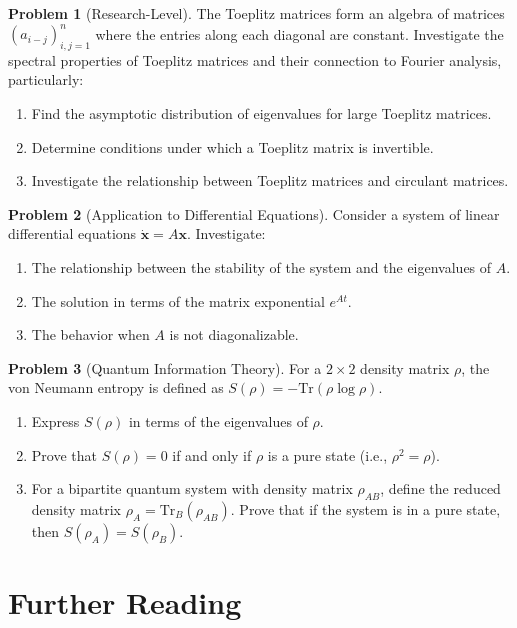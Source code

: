 \documentclass[12pt,a4paper]{article}
\theoremstyle{definition}
\newtheorem{problem}{Problem}[section]
\begin{document}
\begin{problem}[Research-Level]
The Toeplitz matrices form an algebra of matrices $(a_{i-j})_{i,j=1}^n$ where the entries along each diagonal are constant. Investigate the spectral properties of Toeplitz matrices and their connection to Fourier analysis, particularly:
\begin{enumerate}[label=(\alph*)]
\item Find the asymptotic distribution of eigenvalues for large Toeplitz matrices.
\item Determine conditions under which a Toeplitz matrix is invertible.
\item Investigate the relationship between Toeplitz matrices and circulant matrices.
\end{enumerate}
\end{problem}

\begin{problem}[Application to Differential Equations]
Consider a system of linear differential equations $\dot{\mathbf{x}} = A\mathbf{x}$. Investigate:
\begin{enumerate}[label=(\alph*)]
\item The relationship between the stability of the system and the eigenvalues of $A$.
\item The solution in terms of the matrix exponential $e^{At}$.
\item The behavior when $A$ is not diagonalizable.
\end{enumerate}
\end{problem}

\begin{problem}[Quantum Information Theory]
For a $2 \times 2$ density matrix $\rho$, the von Neumann entropy is defined as $S(\rho) = -\text{Tr}(\rho \log \rho)$.
\begin{enumerate}[label=(\alph*)]
\item Express $S(\rho)$ in terms of the eigenvalues of $\rho$.
\item Prove that $S(\rho) = 0$ if and only if $\rho$ is a pure state (i.e., $\rho^2 = \rho$).
\item For a bipartite quantum system with density matrix $\rho_{AB}$, define the reduced density matrix $\rho_A = \text{Tr}_B(\rho_{AB})$. Prove that if the system is in a pure state, then $S(\rho_A) = S(\rho_B)$.
\end{enumerate}
\end{problem}

\section{Further Reading}
\end{document}
